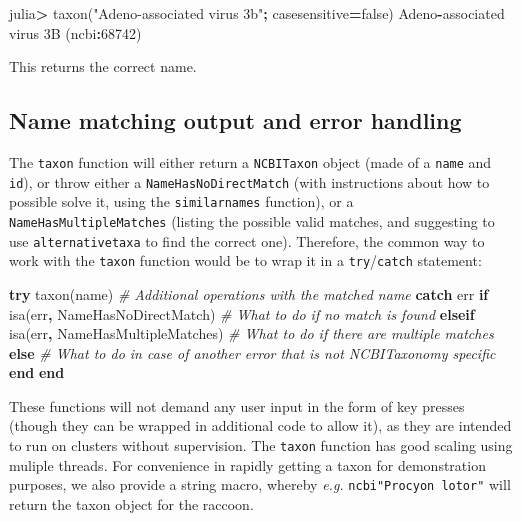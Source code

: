 \documentclass[10pt,oneside]{article}
\newenvironment{Shaded}{\begin{snugshade}}{\end{snugshade}}
\newcommand{\KeywordTok}[1]{\textcolor[rgb]{0.13,0.29,0.53}{\textbf{#1}}}
\newcommand{\FloatTok}[1]{\textcolor[rgb]{0.00,0.00,0.81}{#1}}
\newcommand{\StringTok}[1]{\textcolor[rgb]{0.31,0.60,0.02}{#1}}
\newcommand{\CommentTok}[1]{\textcolor[rgb]{0.56,0.35,0.01}{\textit{#1}}}
\newcommand{\OperatorTok}[1]{\textcolor[rgb]{0.81,0.36,0.00}{\textbf{#1}}}
\newcommand{\ExtensionTok}[1]{#1}
\newcommand{\NormalTok}[1]{#1}
\begin{document}
\begin{Shaded}
\begin{Highlighting}[]
\NormalTok{julia}\OperatorTok{\textgreater{}}\NormalTok{ taxon(}\StringTok{"Adeno{-}associated virus 3b"}\OperatorTok{;}\NormalTok{ casesensitive}\OperatorTok{=}\ExtensionTok{false}\NormalTok{)}
\NormalTok{Adeno}\OperatorTok{{-}}\NormalTok{associated virus }\FloatTok{3}\NormalTok{B (ncbi}\OperatorTok{:}\FloatTok{68742}\NormalTok{)}
\end{Highlighting}
\end{Shaded}

This returns the correct name.

\hypertarget{name-matching-output-and-error-handling}{%
\subsection{Name matching output and error
handling}\label{name-matching-output-and-error-handling}}

The \texttt{taxon} function will either return a \texttt{NCBITaxon}
object (made of a \texttt{name} and \texttt{id}), or throw either a
\texttt{NameHasNoDirectMatch} (with instructions about how to possible
solve it, using the \texttt{similarnames} function), or a
\texttt{NameHasMultipleMatches} (listing the possible valid matches, and
suggesting to use \texttt{alternativetaxa} to find the correct one).
Therefore, the common way to work with the \texttt{taxon} function would
be to wrap it in a \texttt{try}/\texttt{catch} statement:

\begin{Shaded}
\begin{Highlighting}[]
\KeywordTok{try}
\NormalTok{  taxon(name)}
  \CommentTok{\# Additional operations with the matched name}
\KeywordTok{catch}\NormalTok{ err}
  \KeywordTok{if}\NormalTok{ isa(err}\OperatorTok{,}\NormalTok{ NameHasNoDirectMatch)}
    \CommentTok{\# What to do if no match is found}
  \KeywordTok{elseif}\NormalTok{ isa(err}\OperatorTok{,}\NormalTok{ NameHasMultipleMatches)}
    \CommentTok{\# What to do if there are multiple matches}
  \KeywordTok{else}
    \CommentTok{\# What to do in case of another error that is not NCBITaxonomy specific}
  \KeywordTok{end}
\KeywordTok{end}
\end{Highlighting}
\end{Shaded}

These functions will not demand any user input in the form of key
presses (though they can be wrapped in additional code to allow it), as
they are intended to run on clusters without supervision. The
\texttt{taxon} function has good scaling using muliple threads. For
convenience in rapidly getting a taxon for demonstration purposes, we
also provide a string macro, whereby \emph{e.g.}
\texttt{ncbi"Procyon\ lotor"} will return the taxon object for the
raccoon.
\end{document}
